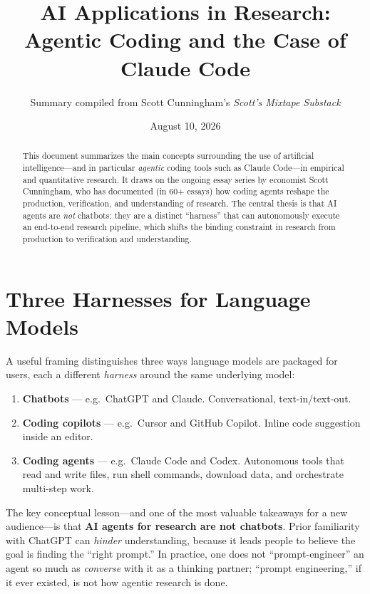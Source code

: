 \documentclass[11pt]{article}
\title{\bfseries AI Applications in Research:\\
\large Agentic Coding and the Case of Claude Code}
\author{Summary compiled from Scott Cunningham's \emph{Scott's Mixtape Substack}}
\date{August 10, 2026}
\begin{document}
\maketitle

\begin{abstract}
\noindent This document summarizes the main concepts surrounding the use of
artificial intelligence---and in particular \emph{agentic} coding tools such as
Claude Code---in empirical and quantitative research. It draws on the ongoing
essay series by economist Scott Cunningham, who has documented (in 60+ essays)
how coding agents reshape the production, verification, and understanding of
research. The central thesis is that AI agents are \emph{not} chatbots: they are
a distinct ``harness'' that can autonomously execute an end-to-end research
pipeline, which shifts the binding constraint in research from production to
verification and understanding.
\end{abstract}

\section{Three Harnesses for Language Models}
A useful framing distinguishes three ways language models are packaged for users,
each a different \emph{harness} around the same underlying model:
\begin{enumerate}[label=\arabic*.]
  \item \textbf{Chatbots} --- e.g.\ ChatGPT and Claude. Conversational, text-in/text-out.
  \item \textbf{Coding copilots} --- e.g.\ Cursor and GitHub Copilot. Inline code suggestion inside an editor.
  \item \textbf{Coding agents} --- e.g.\ Claude Code and Codex. Autonomous tools that read and write files, run shell commands, download data, and orchestrate multi-step work.
\end{enumerate}
The key conceptual lesson---and one of the most valuable takeaways for a new
audience---is that \textbf{AI agents for research are not chatbots}. Prior
familiarity with ChatGPT can \emph{hinder} understanding, because it leads people
to believe the goal is finding the ``right prompt.'' In practice, one does not
``prompt-engineer'' an agent so much as \emph{converse} with it as a thinking
partner; ``prompt engineering,'' if it ever existed, is not how agentic research
is done.
\end{document}
